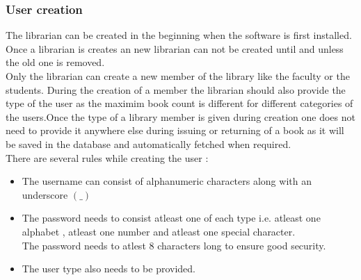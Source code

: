 \documentclass{article}
\begin{document}
\subsubsection*{User creation}
The librarian can be created in the beginning when the software is first installed. Once a librarian is creates an new librarian can not be created until and unless the old one is removed.
\\
Only the librarian can create a new member of the library like the faculty or the students.
During the creation of a member the librarian should also provide the type of the user as the maximim book count is different for different categories of the users.Once the type of a library member is given during creation one does not need to provide it anywhere else during issuing or returning of a book as it will be saved in the database and automatically fetched when required.\\
There are several rules while creating the user :
\begin{itemize}
\item The username can consist of alphanumeric characters along with an underscore $(\_)$
\item The password needs to consist atleast one of each type i.e. atleast one alphabet , atleast one number and atleast one special character.\\
The password needs to atlest 8 characters long to ensure good security.
\item The user type also needs to be provided.

\end{itemize}
\end{document}
